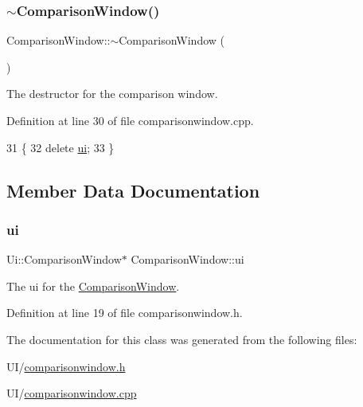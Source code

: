 \subsubsection{\texorpdfstring{$\sim$\+Comparison\+Window()}{~ComparisonWindow()}}
{\footnotesize\ttfamily Comparison\+Window\+::$\sim$\+Comparison\+Window (\begin{DoxyParamCaption}{ }\end{DoxyParamCaption})}



The destructor for the comparison window. 



Definition at line 30 of file comparisonwindow.\+cpp.


\begin{DoxyCode}
31 \{
32     \textcolor{keyword}{delete} \mbox{\hyperlink{class_comparison_window_a18eb77b5884a928a8b958907d1565acf}{ui}};
33 \}
\end{DoxyCode}


\subsection{Member Data Documentation}
\mbox{\label{class_comparison_window_a18eb77b5884a928a8b958907d1565acf}} 
\subsubsection{\texorpdfstring{ui}{ui}}
{\footnotesize\ttfamily Ui\+::\+Comparison\+Window$\ast$ Comparison\+Window\+::ui\hspace{0.3cm}{\ttfamily [private]}}



The ui for the \mbox{\hyperlink{class_comparison_window}{Comparison\+Window}}. 



Definition at line 19 of file comparisonwindow.\+h.



The documentation for this class was generated from the following files\+:\begin{DoxyCompactItemize}
\item 
U\+I/\mbox{\hyperlink{comparisonwindow_8h}{comparisonwindow.\+h}}\item 
U\+I/\mbox{\hyperlink{comparisonwindow_8cpp}{comparisonwindow.\+cpp}}\end{DoxyCompactItemize}
